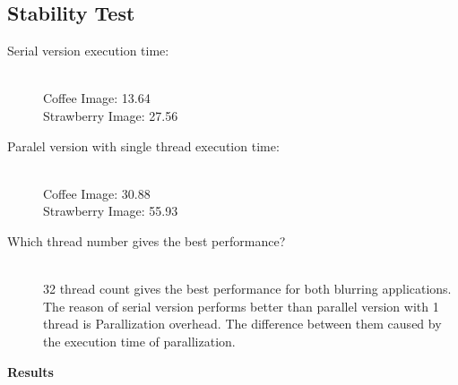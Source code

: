 \documentclass{article}
\begin{document}

\newpage
\subsection{Stability Test}

\begin{description}
    \item[Serial version execution time: ] \hfill \\ 
    Coffee Image: 13.64\\
    Strawberry Image: 27.56\\
    \item[Paralel version with single thread execution time: ] \hfill \\
    Coffee Image: 30.88\\
    Strawberry Image: 55.93\\
    \item[Which thread number gives the best performance?] \hfill \\
    32 thread count gives the best performance for both blurring applications.
    \\
    The reason of serial version performs better than parallel version with 1 thread is Parallization overhead.
    The difference between them caused by the execution time of parallization.
\end{description}

\textbf{Results}
\end{document}
